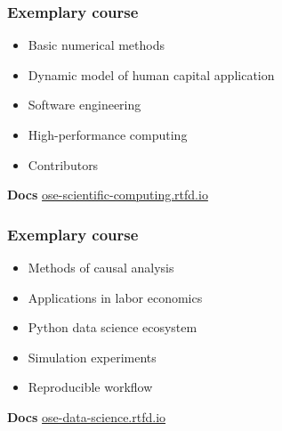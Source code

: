 \begin{frame}\frametitle{Exemplary course}

	\vspace{0.25cm}\vspace{0.3cm}

	\begin{itemize}\setlength\itemsep{1em}
\item Basic numerical methods
\item Dynamic model of human capital application
\item Software engineering
\item High-performance computing
\item Contributors
\end{itemize}

\textbf{Docs}\hspace{0.25cm} \url{ose-scientific-computing.rtfd.io}

\end{frame}
\begin{frame}\frametitle{Exemplary course}

	\vspace{0.25cm}\vspace{0.3cm}

	\begin{itemize}\setlength\itemsep{1em}
\item Methods of causal analysis
\item Applications in labor economics
\item Python data science ecosystem
\item Simulation experiments
\item Reproducible workflow
\end{itemize}

\textbf{Docs}\hspace{0.25cm} \url{ose-data-science.rtfd.io}

\end{frame}
